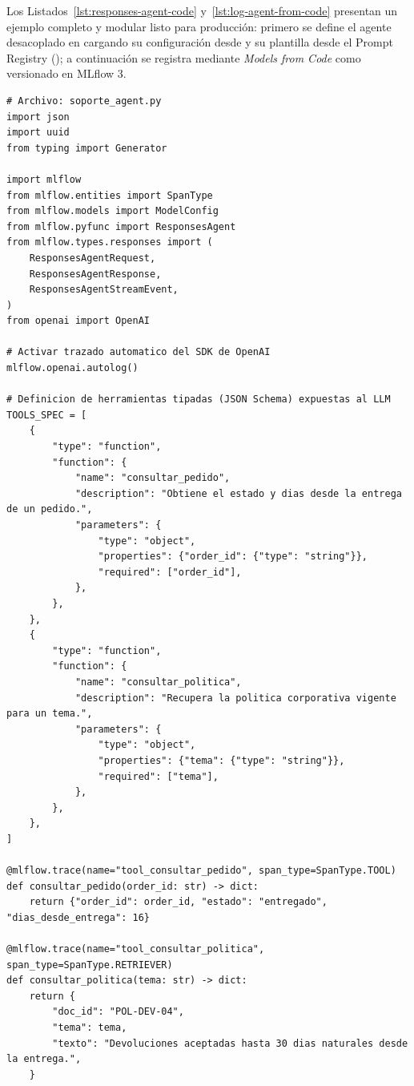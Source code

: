 Los Listados~\ref{lst:responses-agent-code} y~\ref{lst:log-agent-from-code} presentan un ejemplo completo y modular listo para producción: primero se define el agente desacoplado en  cargando su configuración desde  y su plantilla desde el Prompt Registry (); a continuación se registra mediante \textit{Models from Code} como  versionado en MLflow 3.

\begin{lstlisting}[style=python, caption={Implementación completa de un agente de soporte con herramientas tipadas, \textit{streaming} y Prompt Registry mediante \code{ResponsesAgent} (\code{soporte\_agent.py}).}, label={lst:responses-agent-code}]
# Archivo: soporte_agent.py
import json
import uuid
from typing import Generator

import mlflow
from mlflow.entities import SpanType
from mlflow.models import ModelConfig
from mlflow.pyfunc import ResponsesAgent
from mlflow.types.responses import (
    ResponsesAgentRequest,
    ResponsesAgentResponse,
    ResponsesAgentStreamEvent,
)
from openai import OpenAI

# Activar trazado automatico del SDK de OpenAI
mlflow.openai.autolog()

# Definicion de herramientas tipadas (JSON Schema) expuestas al LLM
TOOLS_SPEC = [
    {
        "type": "function",
        "function": {
            "name": "consultar_pedido",
            "description": "Obtiene el estado y dias desde la entrega de un pedido.",
            "parameters": {
                "type": "object",
                "properties": {"order_id": {"type": "string"}},
                "required": ["order_id"],
            },
        },
    },
    {
        "type": "function",
        "function": {
            "name": "consultar_politica",
            "description": "Recupera la politica corporativa vigente para un tema.",
            "parameters": {
                "type": "object",
                "properties": {"tema": {"type": "string"}},
                "required": ["tema"],
            },
        },
    },
]

@mlflow.trace(name="tool_consultar_pedido", span_type=SpanType.TOOL)
def consultar_pedido(order_id: str) -> dict:
    return {"order_id": order_id, "estado": "entregado", "dias_desde_entrega": 16}

@mlflow.trace(name="tool_consultar_politica", span_type=SpanType.RETRIEVER)
def consultar_politica(tema: str) -> dict:
    return {
        "doc_id": "POL-DEV-04",
        "tema": tema,
        "texto": "Devoluciones aceptadas hasta 30 dias naturales desde la entrega.",
    }


\end{lstlisting}
